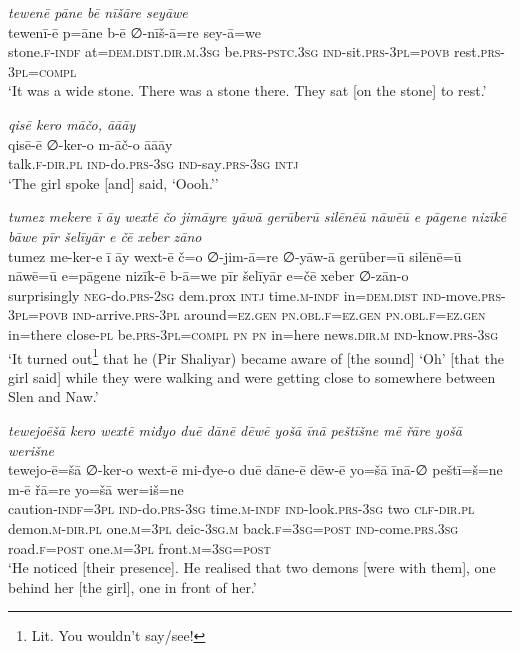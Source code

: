 \ea \label{ŽP.171}
\textit{tewenē pāne bē nīšāre seyāwe} \\ 
\gll tewenī-ē p=āne b-ē ∅-nīš-ā=re sey-ā=we \\ 
 stone\textsc{.f}\textsc{-indf} at=\textsc{dem.dist}\textsc{.dir}\textsc{.m}\textsc{.3sg} be\textsc{.prs}\textsc{-pstc}\textsc{.3sg} \textsc{ind-}sit\textsc{.prs}\textsc{-3pl}\textsc{=\textsc{povb}} rest\textsc{.prs}\textsc{-3pl}\textsc{=compl} \\ 
\glt `It was a wide stone. There was a stone there. They sat [on the stone] to rest.'
\z 
 
\ea \label{ŽP.173}
\textit{qisē kero māčo, āāāy} \\ 
\gll qisē-ē ∅-ker-o m-āč-o āāāy \\ 
 talk\textsc{.f}\textsc{-dir}\textsc{.pl} \textsc{ind-}do\textsc{.prs}\textsc{-3sg} \textsc{ind-}say\textsc{.prs}\textsc{-3sg} \textsc{intj} \\ 
\glt `The girl spoke [and] said, ‘Oooh.’'
\z 
 
\ea \label{ŽP.175}
\textit{tumez mekere ī āy wextē čo jimāyre yāwā gerūberū silēnēū nāwēū e pāgene nizīkē bāwe pīr šelīyār e čē xeber zāno} \\ 
\gll tumez me-ker-e ī āy wext-ē č=o ∅-jim-ā=re ∅-yāw-ā gerūber=ū silēnē=ū nāwē=ū e=pāgene nizīk-ē b-ā=we pīr šelīyār e=čē xeber ∅-zān-o \\ 
 surprisingly \textsc{neg-}do\textsc{.prs}-\textsc{2sg} dem.prox \textsc{intj} time\textsc{.m}\textsc{-indf} in=\textsc{dem.dist} \textsc{ind-}move\textsc{.prs}\textsc{-3pl}\textsc{=\textsc{povb}} \textsc{ind-}arrive\textsc{.prs}\textsc{-3pl} around\textsc{\textsc{=ez.gen}} \textsc{pn}\textsc{.obl}\textsc{.f}\textsc{\textsc{=ez.gen}} \textsc{pn}\textsc{.obl}\textsc{.f}\textsc{\textsc{=ez.gen}} in=there close\textsc{\textsc{-pl}} be\textsc{.prs}\textsc{-3pl}\textsc{=compl} \textsc{pn} \textsc{pn} in=here news\textsc{.dir}\textsc{.m} \textsc{ind-}know\textsc{.prs}\textsc{-3sg} \\ 
\glt `It turned out\footnote{Lit. You wouldn’t say/see!} that he (Pir Shaliyar) became aware of [the sound] ‘Oh’ [that the girl said] while they were walking and were getting close to somewhere between Slen and Naw.'
\z 
 
\ea \label{ŽP.176}
\textit{tewejoēšā kero wextē miđyo duē dānē dēwē yošā īnā peštīšne mē řāre yošā werišne} \\ 
\gll tewejo-ē=šā ∅-ker-o wext-ē mi-đye-o duē dāne-ē dēw-ē yo=šā īnā-∅ peštī=š=ne m-ē řā=re yo=šā wer=iš=ne \\ 
 caution\textsc{-indf}\textsc{=3pl} \textsc{ind-}do\textsc{.prs}\textsc{-3sg} time\textsc{.m}\textsc{-indf} \textsc{ind-}look\textsc{.prs}\textsc{-3sg} two \textsc{clf}\textsc{-dir}\textsc{.pl} demon\textsc{.m}\textsc{-dir}\textsc{.pl} one\textsc{.m}\textsc{=3pl} deic\textsc{-3sg}\textsc{.m} back\textsc{.f}\textsc{=3sg}\textsc{=\textsc{post}} \textsc{ind-}come\textsc{.prs}\textsc{.3sg} road\textsc{.f}\textsc{=\textsc{post}} one\textsc{.m}\textsc{=3pl} front\textsc{.m}\textsc{=3sg}\textsc{=\textsc{post}} \\ 
\glt `He noticed [their presence]. He realised that two demons [were with them], one behind her [the girl], one in front of her.'
\z 
 
